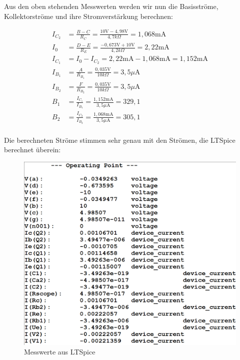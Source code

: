 \documentclass{article}
\begin{document}
Aus den oben stehenden Messwerten werden wir nun die Basisströme, Kollektorströme und ihre Stromverstärkung berechnen:

\begin{align*}
  I_{C_{2}} &= \frac{B-C}{R_{C}} = \frac{10\mathrm{V}-4,98\mathrm{V}}{4,7k\Omega} = 1,068\mathrm{mA}\\
  I_{0} &= \frac{D-E}{R_{E}} = \frac{-0,673\mathrm{V}+10\mathrm{V}}{4,2k\Omega} = 2,22\mathrm{mA}\\
  I_{C_{1}} &= I_{0}-I_{C_{2}} = 2,22\mathrm{mA}-1,068\mathrm{mA} = 1,152\mathrm{mA}\\
  I_{B_{1}} &= \frac{A}{R_{B_{1}}} = \frac{0,035\mathrm{V}}{10k\Omega} = 3,5\mu\mathrm{A}\\
  I_{B_{2}} &= \frac{F}{R_{B_{2}}} = \frac{0,035\mathrm{V}}{10k\Omega} = 3,5\mu\mathrm{A}\\
  B_{1} &= \frac{I_{C_{1}}}{I_{B_{1}}} = \frac{1,152\mathrm{mA}}{3,5\mu\mathrm{A}} = 329,1\\
  B_{2} &= \frac{I_{C_{2}}}{I_{B_{2}}} = \frac{1,068\mathrm{mA}}{3,5\mu\mathrm{A}} = 305,1\\
\end{align*}

Die berechneten Ströme stimmen sehr genau mit den Strömen, die LTSpice berechnet überein:
\begin{figure}[h]
  \centering
  \includegraphics[scale=0.35]{../assets/images/EL2P1/abb2.png}
  \caption{Messwerte aus LTSpice}
  \label{fig:table1}
\end{figure}
\end{document}
